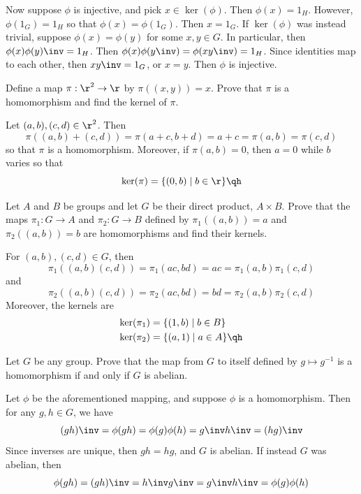 \begin{problems}
\begin{sol}
        Now suppose $\phi$ is injective, and pick $x \in \ker(\phi)$. Then $\phi(x) = 1_H$. However, $\phi(1_G) = 1_H$ so that $\phi(x) = \phi(1_G)$. Then $x = 1_G$. If $\ker(\phi)$ was instead trivial, suppose $\phi(x) = \phi(y)$ for some $x, y \in G$. In particular, then $\phi(x)\phi(y)\inv = 1_H$. Then $\phi(x)\phi(y\inv) = \phi(xy\inv) = 1_H$. Since identities map to each other, then $xy\inv = 1_G$, or $x = y$. Then $\phi$ is injective.
    \end{sol}
    \item Define a map $\pi : \r^2 \to \r$ by $\pi((x,y)) = x$. Prove that $\pi$ is a homomorphism and find the kernel of $\pi$.
    \begin{sol}
        Let $(a, b), (c, d) \in \r^2$. Then
        \[\pi((a, b) + (c, d)) = \pi(a + c, b + d) = a + c = \pi(a, b) = \pi(c, d)\]
        so that $\pi$ is a homomorphism. Moreover, if $\pi(a, b) = 0$, then $a = 0$ while $b$ varies so that
        \[\ker(\pi) = \{(0, b) \mid b \in \r\}\qh\]
    \end{sol}
    \item Let $A$ and $B$ be groups and let $G$ be their direct product, $A \times B$. Prove that the maps $\pi_1 : G \to A$ and $\pi_2 : G \to B$ defined by $\pi_1((a,b)) = a$ and $\pi_2((a,b)) = b$ are homomorphisms and find their kernels.
    \begin{sol}
        For $(a, b), (c, d) \in G$, then
        \[\pi_1((a, b)(c, d)) = \pi_1(ac, bd) = ac = \pi_1(a, b)\pi_1(c, d)\]
        and
        \[\pi_2((a, b)(c, d)) = \pi_2(ac, bd) = bd = \pi_2(a, b)\pi_2(c, d)\]
        Moreover, the kernels are
        \begin{align*}
            \ker(\pi_1) & = \{(1, b) \mid b \in B\} \\
            \ker(\pi_2) & = \{(a, 1) \mid a \in A\} \qh
        \end{align*}
    \end{sol}
    \item Let $G$ be any group. Prove that the map from $G$ to itself defined by $g \mapsto g^{-1}$ is a homomorphism if and only if $G$ is abelian.
    \begin{sol}
        Let $\phi$ be the aforementioned mapping, and suppose $\phi$ is a homomorphism. Then for any $g, h \in G$, we have
        \[(gh)\inv = \phi(gh) = \phi(g)\phi(h) = g\inv h\inv = (hg)\inv\]
        Since inverses are unique, then $gh = hg$, and $G$ is abelian. If instead $G$ was abelian, then
        \[\phi(gh) = (gh)\inv = h\inv g\inv = g\inv h\inv = \phi(g)\phi(h)\]

\end{sol}
\end{problems}
